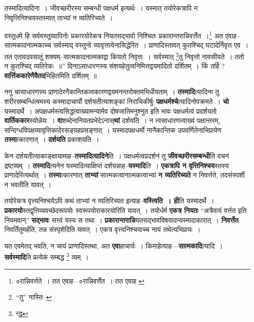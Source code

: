 \documentclass[article,12pt,a4paper]{memoir}
\begin{document}
	तस्मादित्यादिना । जीवच्छरीरस्य सम्बन्धी पक्षधर्म इत्यर्थः । यस्मात् तयोरेकत्रापि न निवृत्तिनिश्चयस्तस्मात् ताभ्यां न व्यतिरिच्यते । 
	  
	वस्तुधमे हि सर्ववस्तुव्यापिनोः प्रकारयोरेकत्र नियतसद्भावो निश्चितः प्रकारान्तरान्निवर्त्तेत ।\footnote{०रान्निवर्त्तते । तत एवाह--\cite{dp-msD} ०रान्निवर्त्तेत । तत एवाह \cite{dp-msC} \cite{dp-msA} \cite{dp-msB} \cite{dp-edP} \cite{dp-edH} \cite{dp-edE} \cite{dp-edN}} अत एवाह--सात्मकादनात्मकाच्च सर्वस्माद् वस्तुनो व्यावृत्तत्वेनासिद्धेरित । प्राणादिस्तावत् कुतश्चिद् घटादेर्निवृत्त एव । तत एतावदवसातुं शक्यम्--सात्मकादनात्मकाद्वा कियतो निवृत्तः । सर्वस्मात् \footnote{“तु” नास्ति--\cite{dp-msC}}\-तु निवृत्तो नावसीयते । ततो न कुतश्चिद् व्यतिरेकः ॥” दिनाऽसाधारणस्य संशयहेतुत्वनिमित्तद्वयमादितो दर्शितम् । किं तर्हि ? \textbf{वार्त्तिककारेणैवैतद}भिहितमिति दर्शितम् ॥
	\pend
      

	  \pstart ननु चासाधारणस्य प्राणादेरनैकान्तिकत्वकारणद्वयमनन्तरोक्तमभिधीयताम् । \textbf{तस्मादि}त्यादिना तु शरीरसम्बन्धित्वमस्य कस्मादाचार्यो दर्शयतीत्याशङ्कां निराचिकीर्षुः \textbf{पक्षधर्मश्चे}त्यादिनोपक्रमते । \textbf{चो} यस्मादर्थे । अपक्षधर्मस्त्वसिद्धत्वाख्यामन्यामेव दोषजातिमनुश्नुत इति भावः पक्षधर्मत्वं प्रदर्शयतो \textbf{वार्तिककार}स्योन्नेयः । \textbf{वा}शब्देनानियतप्रभेदेऽनास्\textbf{थां} दर्शयति । न त्वसाधारणत्वाख्यं पक्षान्तरम्, सन्दिग्धविपक्षव्यावृत्तिकादेरसङ्ग्रहप्रसङ्गात् । यस्मादपक्षधर्मो नानैकान्तिक उपवर्णितेनाभिप्रायेण \textbf{तस्मा}त्कारणात् । \textbf{दर्शयति} प्रकाशयति ।
	\pend
      

	  \pstart केन दर्शयतीत्याकाङ्क्षायामाह--\textbf{तस्मादित्यादिने}ति । पक्षधर्मत्वप्रदर्शनं तु \textbf{जीवच्छरीरसम्बन्धी}ति वचनं द्रष्टव्यम् । \textbf{तस्मादि}त्यनेन यस्मादित्याक्षिप्तं दर्शयन्नाह--\textbf{यस्मादि}ति । \textbf{एकत्रापि न वृत्तिनिश्चय}स्तस्य प्राणादेरित्यर्थात् । \textbf{तस्मा}त्कारणात् \textbf{ताभ्यां} सात्मकत्वानात्मकत्वाभ्यां \textbf{न व्यतिरिच्यते} न निवर्त्तते, तदसंस्पर्शी न भवतीति यावत् ।
	\pend
      

	  \pstart तयोरेकत्र वृत्त्यनिश्चयेऽपि कथं ताभ्यां न व्यतिरिच्यत इत्याह--\textbf{वस्त्विति । ही}ति यस्मादर्थे । \textbf{प्रकारयो}स्तद्वृत्तिव्यवच्छेदरूपयोः स्वरूपयोराकारयोरिति यावत् । तयोर्धर्म \textbf{एकत्र नियतः} “अत्रैवायं वर्त्तत इति नियमवान्” \textbf{सद्भावः} सत्त्वं यस्य स तथा । \textbf{प्रकारान्तरान्नि}यतसद्भावविषयादन्यस्मादाकारात् । \textbf{निवर्त्तेत} निवर्तितुमर्हति, तन्न संस्पृशेदिति यावत् । एकत्र वृत्त्यनिश्चयाच्च नायं तथेत्यभिप्रायः ।
	\pend
      

	  \pstart यत एवमेतद् भवति, न चायं प्राणादिस्तथा, अत \textbf{एवा}हाचार्यः । किमाहेत्याह—\textbf{सात्मकादि}त्यादि । \textbf{सर्वस्मादि}ति प्रत्येकं सम्बद्ध \footnote{न्द्ध} व्यम् ।
	\pend
	  \bigskip
	  \begingroup
	
\end{document}
